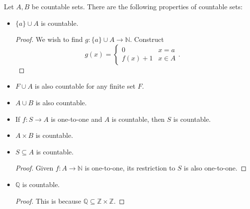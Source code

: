 \documentclass[a4paper]{article}
\begin{document}
\begin{property}
	Let \( A,B \) be countable sets. There are the following properties of countable sets:
	\begin{itemize}
		\item \( \{a\} \cup A  \) is countable.
			\begin{proof}
				We wish to find \( g \colon \{a\}  \cup  A \to \mathbb{N}  \). Construct \[
					g(x) = \begin{cases}
						0 & x = a \\
						f(x) + 1 & x \in A
					\end{cases}
				.\] 		
			\end{proof}
		\item \( F \cup A \) is also countable for any finite set \( F \).
		\item \( A \cup  B \) is also countable.
		\item If \( f \colon S \to A \) is one-to-one and \( A \) is countable, then \( S \) is countable.
		\item \( A \times B \) is countable.
		\item \( S \subseteq A \) is countable.
			\begin{proof}
				Given \( f \colon A \to  \mathbb{N} \) is one-to-one, its restriction to \( S \) is also one-to-one.
			\end{proof}
		\item \( \mathbb{Q} \) is countable.
			\begin{proof}
				This is because \( \mathbb{Q} \subseteq \mathbb{Z} \times \mathbb{Z} \). 
			\end{proof}
	\end{itemize}
\end{property}
\end{document}

